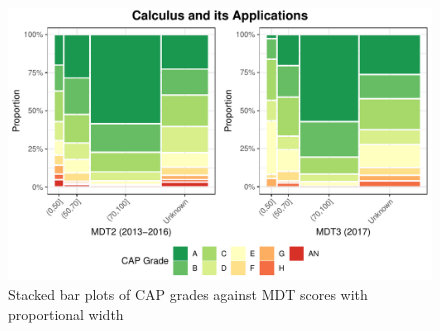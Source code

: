 \documentclass[a4paper]{report}
\begin{document}
\begin{figure}[H]
  \centering
  \includegraphics[width=\linewidth]{fig/REL_CAPGrade_vs_MDT.pdf}
  \caption{\label{fig:REL_CAPGrade_vs_MDT}Stacked bar plots of CAP grades against MDT scores with proportional width}
\end{figure}
\end{document}
